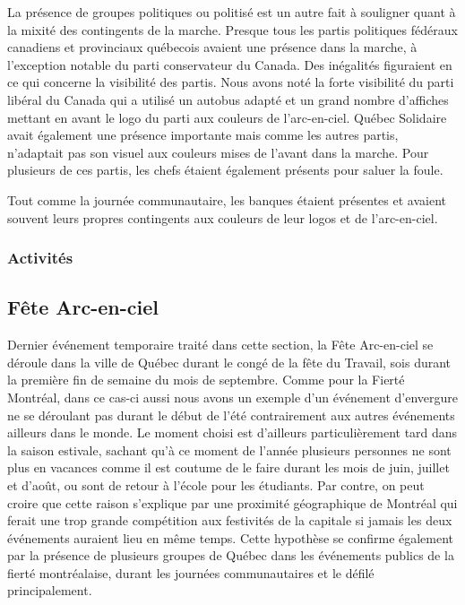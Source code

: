 La présence de groupes politiques ou politisé est un autre fait à souligner quant à la mixité des contingents de la marche.
Presque tous les partis politiques fédéraux canadiens et provinciaux québecois avaient une présence dans la marche, à l'exception notable du parti conservateur du Canada.
Des inégalités figuraient en ce qui concerne la visibilité des partis.
Nous avons noté la forte visibilité du parti libéral du Canada qui a utilisé un autobus adapté et un grand nombre d'affiches mettant en avant le logo du parti aux couleurs de l'arc-en-ciel.
Québec Solidaire avait également une présence importante mais comme les autres partis, n'adaptait pas son visuel aux couleurs mises de l'avant dans la marche.
Pour plusieurs de ces partis, les chefs étaient également présents pour saluer la foule.

Tout comme la journée communautaire, les banques étaient présentes et avaient souvent leurs propres contingents aux couleurs de leur logos et de l'arc-en-ciel.
\subsubsection{Activités}
\label{subsec:activitesfiertemontreal}



\subsection{Fête Arc-en-ciel}
\label{subsec:fetearcenciel}
Dernier événement temporaire traité dans cette section, la Fête Arc-en-ciel se déroule dans la ville de Québec durant le congé de la fête du Travail, sois durant la première fin de semaine du mois de septembre.
Comme pour la Fierté Montréal, dans ce cas-ci aussi nous avons un exemple d'un événement d'envergure ne se déroulant pas durant le début de l'été contrairement aux autres événements ailleurs dans le monde.
Le moment choisi est d'ailleurs particulièrement tard dans la saison estivale, sachant qu'à ce moment de l'année plusieurs personnes ne sont plus en vacances comme il est coutume de le faire durant les mois de juin, juillet et d'août, ou sont de retour à l'école pour les étudiants.
Par contre, on peut croire que cette raison s'explique par une proximité géographique de Montréal qui ferait une trop grande compétition aux festivités de la capitale si jamais les deux événements auraient lieu en même temps.
Cette hypothèse se confirme également par la présence de plusieurs groupes de Québec dans les événements publics de la fierté montréalaise, durant les journées communautaires et le défilé principalement.

